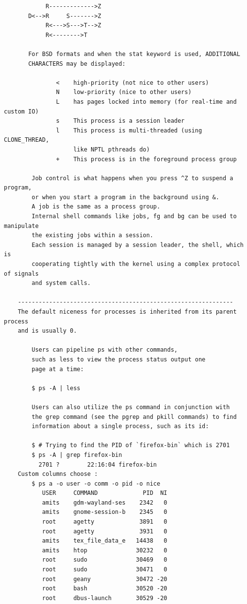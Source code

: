\documentclass[a4paper,12pt]{article}
\begin{document}
\begin{verbatim}
            R------------->Z
       D<-->R     S------->Z
            R<--->S--->T-->Z
            R<-------->T
       
       For BSD formats and when the stat keyword is used, ADDITIONAL
       CHARACTERS may be displayed:

               <    high-priority (not nice to other users)
               N    low-priority (nice to other users)
               L    has pages locked into memory (for real-time and custom IO)
               s    This process is a session leader
               l    This process is multi-threaded (using CLONE_THREAD,
                    like NPTL pthreads do)
               +    This process is in the foreground process group
               
        Job control is what happens when you press ^Z to suspend a program,
        or when you start a program in the background using &. 
        A job is the same as a process group. 
        Internal shell commands like jobs, fg and bg can be used to manipulate
        the existing jobs within a session. 
        Each session is managed by a session leader, the shell, which is 
        cooperating tightly with the kernel using a complex protocol of signals
        and system calls.          
  
    --------------------------------------------------------------    
    The default niceness for processes is inherited from its parent process
    and is usually 0.
    
        Users can pipeline ps with other commands, 
        such as less to view the process status output one 
        page at a time:
        
        $ ps -A | less
        
        Users can also utilize the ps command in conjunction with    
        the grep command (see the pgrep and pkill commands) to find 
        information about a single process, such as its id:
        
        $ # Trying to find the PID of `firefox-bin` which is 2701
        $ ps -A | grep firefox-bin
          2701 ?        22:16:04 firefox-bin
    Custom columns choose : 
        $ ps a -o user -o comm -o pid -o nice    
           USER     COMMAND             PID  NI
           amits    gdm-wayland-ses    2342   0
           amits    gnome-session-b    2345   0
           root     agetty             3891   0
           root     agetty             3931   0
           amits    tex_file_data_e   14438   0
           amits    htop              30232   0
           root     sudo              30469   0
           root     sudo              30471   0
           root     geany             30472 -20
           root     bash              30520 -20
           root     dbus-launch       30529 -20


\end{verbatim}
\end{document}
